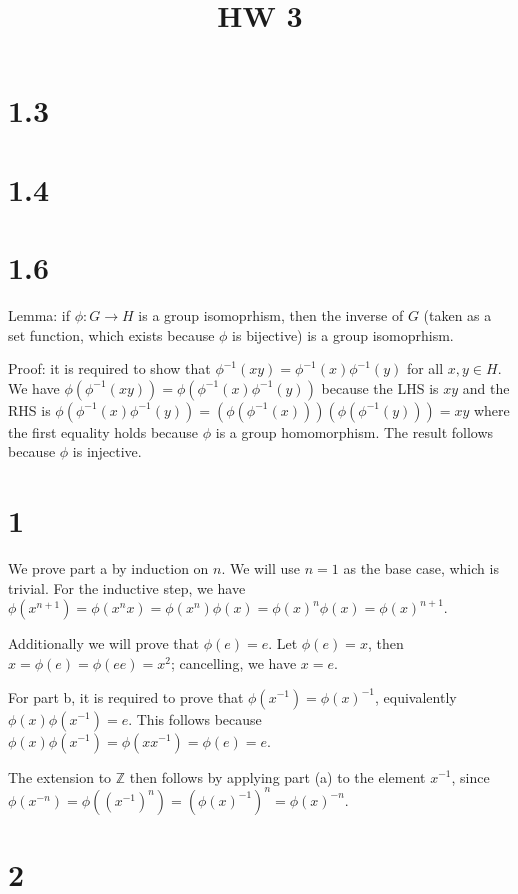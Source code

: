 \documentclass{article}
\title{HW 3}
\date{}
\def\Z{\mathbb{Z}}
\def\inv{{-1}}
\begin{document}
\maketitle

\section*{1.3}

\section*{1.4}

\section*{1.6}

Lemma: if $\phi: G \to H$ is a group isomoprhism, then the inverse of $G$ (taken as a set function, which exists because $\phi$ is bijective) is a group isomoprhism.

Proof: it is required to show that $\phi^\inv(xy) = \phi^\inv(x)\phi^\inv(y)$ for all $x, y \in H$. We have $\phi(\phi^\inv(xy)) = \phi(\phi^\inv(x)\phi^\inv(y))$ because the LHS is $xy$ and the RHS is $\phi(\phi^\inv(x)\phi^\inv(y)) = (\phi(\phi^\inv(x))) (\phi(\phi^\inv(y))) = xy$ where the first equality holds because $\phi$ is a group homomorphism. The result follows because $\phi$ is injective.

\section*{1}

We prove part a by induction on $n$. We will use $n=1$ as the base case, which is trivial. For the inductive step, we have $\phi(x^{n+1}) = \phi(x^n x) = \phi(x^n) \phi(x) = \phi(x)^n \phi(x) = \phi(x)^{n+1}$.

Additionally we will prove that $\phi(e) = e$. Let $\phi(e) = x$, then $x = \phi(e) = \phi(ee) = x^2$; cancelling, we have $x = e$.

For part b, it is required to prove that $\phi(x^\inv) = \phi(x)^\inv$, equivalently $\phi(x) \phi(x^\inv) = e$. This follows because $\phi(x) \phi(x^\inv) = \phi(x x^\inv) = \phi(e) = e$.

The extension to $\Z$ then follows by applying part (a) to the element $x^\inv$, since $\phi(x^{-n}) = \phi((x^\inv)^n) = (\phi(x)^\inv)^n = \phi(x)^{-n}$.

\section*{2}
\end{document}

